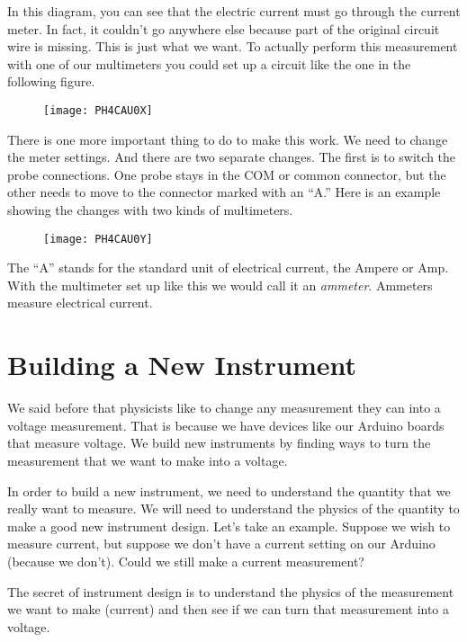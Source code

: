 In this diagram, you can see that the electric current must go through the current meter. In fact, it couldn't go anywhere else because part of the original circuit wire is missing. This is just what we want. To actually perform this measurement with one of our multimeters you could set up a circuit like the one in the following figure. 

\begin{figure}[h!]
	\centering
    \texttt{[image: PH4CAU0X]}
\end{figure}

There is one more important thing to do to make this work. We need to change the meter settings. And there are two separate changes. The first is to switch the probe connections. One probe stays in the COM or common connector, but the other needs to move to the connector marked with an ``A.'' Here is an example showing the changes with two kinds of multimeters. 

\begin{figure}[h!]
    \centering
    \texttt{[image: PH4CAU0Y]}
\end{figure}

The ``A'' stands for the standard unit of electrical current, the Ampere or Amp. With the multimeter set up like this we would call it an \emph{ammeter}. Ammeters measure electrical current.

\section{Building a New Instrument} \label{New_Instrument_Section}

We said before that physicists like to change any measurement they can into a voltage measurement. That is because we have devices like our Arduino boards that measure voltage. We build new instruments by finding ways to turn the measurement that we want to make into a voltage.

In order to build a new instrument, we need to understand the quantity that we really want to measure. We will need to understand the physics of the quantity to make a good new instrument design. Let's take an example. Suppose we wish to measure current, but suppose we don't have a current setting on our Arduino (because we don't). Could we still make a current measurement?

The secret of instrument design is to understand the physics of the measurement we want to make (current) and then see if we can turn that measurement into a voltage.

